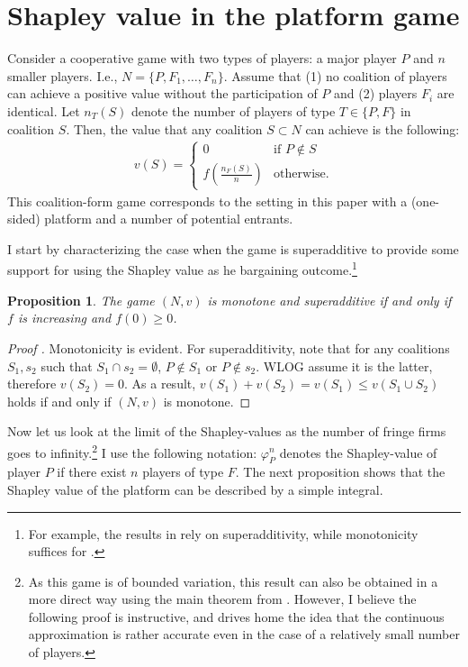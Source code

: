 \documentclass[a4paper]{article}
\newtheorem{proposition}{Proposition}
\begin{document}
\appendix

\printbibliography


\section{Shapley value in the platform game}

Consider a cooperative game with two types of players: a major player $P$ and $n$ smaller players.
I.e., $N = \{P, F_1, \dots, F_n\}$.
Assume that (1) no coalition of players can achieve a positive value without the participation of $P$ and (2) players $F_i$ are identical.
Let $n_T(S)$ denote the number of players of type $T \in \{P, F\}$ in coalition $S$. Then, the value that any coalition $S \subset N$ can achieve is the following:
\begin{align*}
    v(S) = \begin{cases}
        0                              & \text{if } P \notin S \\
        f\left(\frac{n_F(S)}{n}\right) & \text{otherwise}.
    \end{cases}
\end{align*}
This coalition-form game corresponds to the setting in this paper with a (one-sided) platform and a number of potential entrants.

I start by characterizing the case when the game is superadditive to provide some support for using the Shapley value as he bargaining outcome.\footnote{For example, the results in \textcite{gul1989bargaining} rely on superadditivity, while monotonicity suffices for \textcite[]{hart1996bargaining}.}

\begin{proposition}
    \label{prop:monotone}
    The game $(N, v)$ is monotone and superadditive if and only if $f$ is increasing and $f(0) \geq 0$. %
\end{proposition}

\begin{proof}[Proof%
    ]
    Monotonicity is evident. For superadditivity, note that for any coalitions $S_1, s_2$ such that $S_1 \cap s_2 = \emptyset$, $P \notin S_1$ or $P \notin s_2$. WLOG assume it is the latter, therefore $v(S_2) = 0$. As a result, $v(S_1) + v(S_2) = v(S_1) \leq v(S_1 \cup S_2)$ holds if and only if $(N, v)$ is monotone.
\end{proof}

Now let us look at the limit of the Shapley-values as the number of fringe firms goes to infinity.\footnote{
    As this game is of bounded variation, this result can also be obtained in a more direct way using the main theorem from \textcite{fogelman1980asymptotic}.
    However, I believe the following proof is instructive, and drives home the idea that the continuous approximation is rather accurate even in the case of a relatively small number of players.
}
I use the following notation: $\varphi_P^n$ denotes the Shapley-value of player $P$ if there exist $n$ players of type $F$.
The next proposition shows that the Shapley value of the platform can be described by a simple integral.
\end{document}
